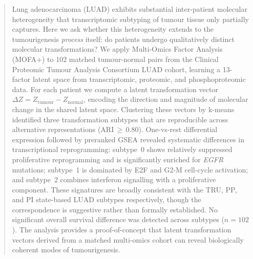 \begin{abstract}
Lung adenocarcinoma (LUAD) exhibits substantial inter-patient molecular heterogeneity
that transcriptomic subtyping of tumour tissue only partially captures.
Here we ask whether this heterogeneity extends to the tumourigenesis \emph{process}
itself: do patients undergo qualitatively distinct molecular transformations?
We apply Multi-Omics Factor Analysis (MOFA+) to 102 matched tumour-normal pairs from the
Clinical Proteomic Tumour Analysis Consortium LUAD cohort, learning a 13-factor latent
space from transcriptomic, proteomic, and phosphoproteomic data.
For each patient we compute a latent transformation vector
$\Delta Z = Z_{\text{tumour}} - Z_{\text{normal}}$,
encoding the direction and magnitude of molecular change in the shared latent space.
Clustering these vectors by k-means identified three transformation subtypes that are
reproducible across alternative representations (ARI\,$\geq$\,0.80).
One-vs-rest differential expression followed by preranked GSEA revealed systematic
differences in transcriptional reprogramming: subtype~0 shows relatively suppressed
proliferative reprogramming and is significantly enriched for \textit{EGFR} mutations;
subtype~1 is dominated by E2F and G2-M cell-cycle activation; and subtype~2 combines
interferon signalling with a proliferative component.
These signatures are broadly consistent with the TRU, PP, and PI state-based LUAD
subtypes respectively, though the correspondence is suggestive rather than formally
established.
No significant overall survival difference was detected across subtypes ($n = 102$).
The analysis provides a proof-of-concept that latent transformation vectors derived
from a matched multi-omics cohort can reveal biologically coherent modes of
tumourigenesis.
\end{abstract}
